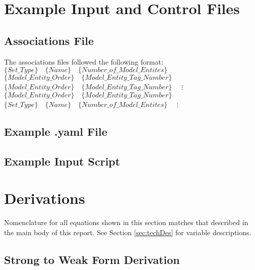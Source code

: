 \documentclass[a4paper, 12pt]{article}
\begin{document}
\newpage
\section{Example Input and Control Files}\label{sec:ExInput}

\subsection{Associations File} \label{subsec:ExAssoc}
The associations files followed the following format:
\newline
$\{Set\_Type\} \quad  \{Name\} \quad  \{Number\_of\_Model\_Entites\} \quad $
\newline
$\{Model\_Entity\_Order\} \quad  \{Model\_Entity\_Tag\_Number\} \quad $
\newline
$\{Model\_Entity\_Order\} \quad  \{Model\_Entity\_Tag\_Number\} \quad $
\newline
$\vdots$
\newline
$\{Model\_Entity\_Order\} \quad  \{Model\_Entity\_Tag\_Number\} \quad $
\newline
$\{Set\_Type\} \quad  \{Name\} \quad  \{Number\_of\_Model\_Entites\} \quad $
\newline
$\vdots$
\newline


\newpage
\subsection{Example .yaml File} \label{subsec:ExYaml}


\newpage
\subsection{Example Input Script} \label{subsec:ExIn}


\newpage
\section{Derivations} \label{sec:Derivations}

Nomenclature for all equations shown in this section
matches that described in the main body of this report.
See Section \ref{sec:techDes} for variable descriptions.

\subsection{Strong to Weak Form Derivation} \label{sec:WeakDer}
\end{document}
